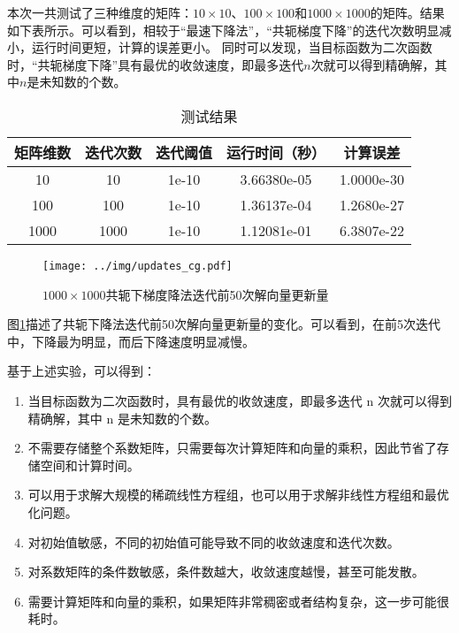 \documentclass[12pt, onecolumn]{article}
\newcommand\normf{\fangsong}
\begin{document}
		本次一共测试了三种维度的矩阵：$10\times 10$、$100\times 100$和$1000\times 1000$的矩阵。结果如下表所示。可以看到，相较于“最速下降法”，“共轭梯度下降”的迭代次数明显减小，运行时间更短，计算的误差更小。
		同时可以发现，当目标函数为二次函数时，“共轭梯度下降”具有最优的收敛速度，即最多迭代$n$次就可以得到精确解，其中$n$是未知数的个数。
		\begin{table}[h]
		\normf
			\centering
			\caption{\normf 测试结果}
			\vspace{2mm}
		\begin{tabular}{c|cccc}
		\hline
		矩阵维数 & 迭代次数 & 迭代阈值  & 运行时间（秒）     & 计算误差       \\ \hline
		10   & 10   & 1e-10 & 3.66380e-05 & 1.0000e-30 \\
		100  & 100  & 1e-10 & 1.36137e-04 & 1.2680e-27 \\
		1000 & 1000 & 1e-10 & 1.12081e-01 & 6.3807e-22 \\ \hline
		\end{tabular}
		\end{table}
		
		\begin{figure}[h]
			\centering
			\texttt{[image: ../img/updates\_cg.pdf]}
			\caption{\normf $1000\times 1000$共轭下梯度降法迭代前50次解向量更新量}
			\label{fig:共轭下降法迭代前50次解向量更新量}
		\end{figure}
		图\ref{fig:共轭下降法迭代前50次解向量更新量}描述了共轭下降法迭代前50次解向量更新量的变化。可以看到，在前5次迭代中，下降最为明显，而后下降速度明显减慢。
		
		基于上述实验，可以得到：
		\begin{enumerate}
		\item 当目标函数为二次函数时，具有最优的收敛速度，即最多迭代 n 次就可以得到精确解，其中 n 是未知数的个数。
		
		\item 不需要存储整个系数矩阵，只需要每次计算矩阵和向量的乘积，因此节省了存储空间和计算时间。
		
		\item 可以用于求解大规模的稀疏线性方程组，也可以用于求解非线性方程组和最优化问题。
		
		\item 对初始值敏感，不同的初始值可能导致不同的收敛速度和迭代次数。
		
		\item 对系数矩阵的条件数敏感，条件数越大，收敛速度越慢，甚至可能发散。
		
		\item 需要计算矩阵和向量的乘积，如果矩阵非常稠密或者结构复杂，这一步可能很耗时。
		\end{enumerate}
		
\end{document}
